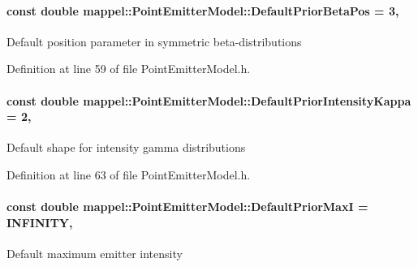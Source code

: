 \paragraph[{\texorpdfstring{Default\+Prior\+Beta\+Pos}{DefaultPriorBetaPos}}]{\setlength{\rightskip}{0pt plus 5cm}const double mappel\+::\+Point\+Emitter\+Model\+::\+Default\+Prior\+Beta\+Pos = 3\hspace{0.3cm}{\ttfamily [static]}, {\ttfamily [inherited]}}\hypertarget{classmappel_1_1PointEmitterModel_a2771dc4415f351862619cd9671b5310d}{}\label{classmappel_1_1PointEmitterModel_a2771dc4415f351862619cd9671b5310d}
Default position parameter in symmetric beta-\/distributions 

Definition at line 59 of file Point\+Emitter\+Model.\+h.

\paragraph[{\texorpdfstring{Default\+Prior\+Intensity\+Kappa}{DefaultPriorIntensityKappa}}]{\setlength{\rightskip}{0pt plus 5cm}const double mappel\+::\+Point\+Emitter\+Model\+::\+Default\+Prior\+Intensity\+Kappa = 2\hspace{0.3cm}{\ttfamily [static]}, {\ttfamily [inherited]}}\hypertarget{classmappel_1_1PointEmitterModel_a03d9f90c130df2d42d0d31c9337e914c}{}\label{classmappel_1_1PointEmitterModel_a03d9f90c130df2d42d0d31c9337e914c}
Default shape for intensity gamma distributions 

Definition at line 63 of file Point\+Emitter\+Model.\+h.

\paragraph[{\texorpdfstring{Default\+Prior\+MaxI}{DefaultPriorMaxI}}]{\setlength{\rightskip}{0pt plus 5cm}const double mappel\+::\+Point\+Emitter\+Model\+::\+Default\+Prior\+MaxI = I\+N\+F\+I\+N\+I\+TY\hspace{0.3cm}{\ttfamily [static]}, {\ttfamily [inherited]}}\hypertarget{classmappel_1_1PointEmitterModel_a4ad3422744bdac162e905d5615bf5b66}{}\label{classmappel_1_1PointEmitterModel_a4ad3422744bdac162e905d5615bf5b66}
Default maximum emitter intensity 

